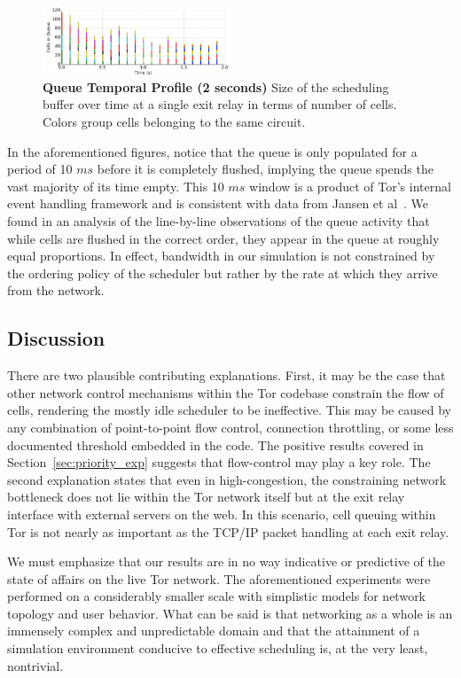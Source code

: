 \begin{figure} \centering
  \includegraphics[width=0.5\textwidth]{images/scheduling_close.png}
  \caption[Queue Temporal Profile (2 seconds)]{\textbf{Queue Temporal Profile
      (2 seconds)} Size of the scheduling buffer over time at a single exit
    relay in terms of number of cells. Colors group cells belonging to the same
    circuit.}
  \label{fig:scheduling_close}
\end{figure}


In the aforementioned figures, notice that the queue is only populated for a
period of 10 $ms$ before it is completely flushed, implying the queue spends the
vast majority of its time empty. This 10 $ms$ window is a product of Tor's
internal event handling framework and is consistent with data from Jansen et
al~\cite{jansen2017tor}. We found in an analysis of the line-by-line
observations of the queue activity that while cells are flushed in the correct
order, they appear in the queue at roughly equal proportions. In effect,
bandwidth in our simulation is not constrained by the ordering policy of the
scheduler but rather by the rate at which they arrive from the network.

\subsection{Discussion}

There are two plausible contributing explanations. First, it may be the case
that other network control mechanisms within the Tor codebase constrain the flow
of cells, rendering the mostly idle scheduler to be ineffective. This may be
caused by any combination of point-to-point flow control, connection throttling,
or some less documented threshold embedded in the code. The positive results
covered in Section~\ref{sec:priority_exp} suggests that flow-control may play a
key role. The second explanation states that even in high-congestion, the
constraining network bottleneck does not lie within the Tor network itself but
at the exit relay interface with external servers on the web. In this scenario,
cell queuing within Tor is not nearly as important as the TCP/IP packet handling
at each exit relay.

We must emphasize that our results are in no way indicative or predictive of the
state of affairs on the live Tor network. The aforementioned experiments were
performed on a considerably smaller scale with simplistic models for network
topology and user behavior. What can be said is that networking as a whole is an
immensely complex and unpredictable domain and that the attainment of a
simulation environment conducive to effective scheduling is, at the very least,
nontrivial.
